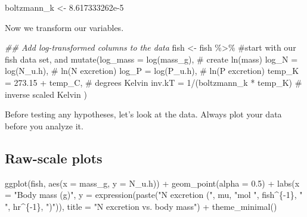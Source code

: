 \documentclass[
  letterpaper,
  DIV=11,
  numbers=noendperiod]{scrreprt}
\newenvironment{Shaded}{\begin{snugshade}}{\end{snugshade}}
\newcommand{\AttributeTok}[1]{\textcolor[rgb]{0.40,0.45,0.13}{#1}}
\newcommand{\CommentTok}[1]{\textcolor[rgb]{0.37,0.37,0.37}{#1}}
\newcommand{\DecValTok}[1]{\textcolor[rgb]{0.68,0.00,0.00}{#1}}
\newcommand{\DocumentationTok}[1]{\textcolor[rgb]{0.37,0.37,0.37}{\textit{#1}}}
\newcommand{\FloatTok}[1]{\textcolor[rgb]{0.68,0.00,0.00}{#1}}
\newcommand{\FunctionTok}[1]{\textcolor[rgb]{0.28,0.35,0.67}{#1}}
\newcommand{\NormalTok}[1]{\textcolor[rgb]{0.00,0.23,0.31}{#1}}
\newcommand{\OtherTok}[1]{\textcolor[rgb]{0.00,0.23,0.31}{#1}}
\newcommand{\SpecialCharTok}[1]{\textcolor[rgb]{0.37,0.37,0.37}{#1}}
\newcommand{\StringTok}[1]{\textcolor[rgb]{0.13,0.47,0.30}{#1}}
\begin{document}
\begin{Shaded}
\begin{Highlighting}[]
\NormalTok{boltzmann\_k }\OtherTok{\textless{}{-}} \FloatTok{8.617333262e{-}5}
\end{Highlighting}
\end{Shaded}

Now we transform our variables.

\begin{Shaded}
\begin{Highlighting}[]
\DocumentationTok{\#\# Add log{-}transformed columns to the data}
\NormalTok{fish }\OtherTok{\textless{}{-}}\NormalTok{ fish }\SpecialCharTok{\%\textgreater{}\%} \CommentTok{\#start with our fish data set, and}
  \FunctionTok{mutate}\NormalTok{(}\AttributeTok{log\_mass =} \FunctionTok{log}\NormalTok{(mass\_g), }\CommentTok{\# create ln(mass)}
         \AttributeTok{log\_N =} \FunctionTok{log}\NormalTok{(N\_u.h), }\CommentTok{\# ln(N excretion)}
         \AttributeTok{log\_P =} \FunctionTok{log}\NormalTok{(P\_u.h), }\CommentTok{\# ln(P excretion)}
         \AttributeTok{temp\_K =} \FloatTok{273.15} \SpecialCharTok{+}\NormalTok{ temp\_C, }\CommentTok{\# degrees Kelvin}
         \AttributeTok{inv.kT =} \DecValTok{1}\SpecialCharTok{/}\NormalTok{(boltzmann\_k }\SpecialCharTok{*}\NormalTok{ temp\_K) }\CommentTok{\# inverse scaled Kelvin}
\NormalTok{  )}
\end{Highlighting}
\end{Shaded}

Before testing any hypotheses, let's look at the data. Always plot your
data before you analyze it.

\subsection{Raw-scale plots}\label{raw-scale-plots}

\begin{Shaded}
\begin{Highlighting}[]
\FunctionTok{ggplot}\NormalTok{(fish, }\FunctionTok{aes}\NormalTok{(}\AttributeTok{x =}\NormalTok{ mass\_g, }\AttributeTok{y =}\NormalTok{ N\_u.h)) }\SpecialCharTok{+}
  \FunctionTok{geom\_point}\NormalTok{(}\AttributeTok{alpha =} \FloatTok{0.5}\NormalTok{) }\SpecialCharTok{+}
  \FunctionTok{labs}\NormalTok{(}\AttributeTok{x =} \StringTok{"Body mass (g)"}\NormalTok{,}
       \AttributeTok{y =} \FunctionTok{expression}\NormalTok{(}\FunctionTok{paste}\NormalTok{(}\StringTok{"N excretion ("}\NormalTok{, mu, }\StringTok{"mol "}\NormalTok{, fish}\SpecialCharTok{\^{}}\NormalTok{\{}\SpecialCharTok{{-}}\DecValTok{1}\NormalTok{\}, }\StringTok{" "}\NormalTok{, hr}\SpecialCharTok{\^{}}\NormalTok{\{}\SpecialCharTok{{-}}\DecValTok{1}\NormalTok{\}, }\StringTok{")"}\NormalTok{)),}
       \AttributeTok{title =} \StringTok{"N excretion vs. body mass"}\NormalTok{) }\SpecialCharTok{+}
  \FunctionTok{theme\_minimal}\NormalTok{()}
\end{Highlighting}
\end{Shaded}
\end{document}
